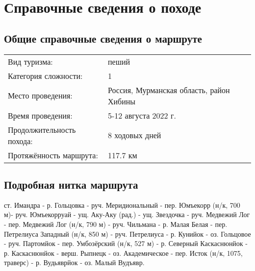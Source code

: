 \newpage
\section{Справочные сведения о походе}
\subsection{Общие справочные сведения о маршруте}
\begin{tabular}{ l l }
    Вид туризма: & пеший\\
    Категория сложности: & 1\\
    Место проведения: & Россия, Мурманская область, район Хибины\\
    Время проведения: & 5-12 августа 2022 г.\\
    Продолжительность похода: & 8 ходовых дней\\
    Протяжённость маршрута: & 117.7 км\\
\end{tabular}

\subsection{Подробная нитка маршрута}
ст. Имандра - р. Гольцовка - руч. Меридиональный - пер. Юмъекорр (н/к, 700 м)- руч. Юмъекорруай -
ущ. Аку-Аку (рад.) - ущ. Звездочка - руч. Медвежий Лог - пер. Медвежий Лог (н/к, 790 м) - руч. Чильмана -
р. Малая Белая - пер. Петрелиуса Западный (н/к, 850 м) - руч. Петрелиуса - р. Кунийок - оз. Гольцовое -
руч. Партомйок - пер. Умбозёрский (н/к, 527 м) - р. Северный Каскаснюнйок - р. Каскаснюнйок - верш. Рыпнецк -
оз. Академическое - пер. Исток (н/к, 1075, траверс) - р. Вудьяврйок - оз. Малый Вудъявр.

